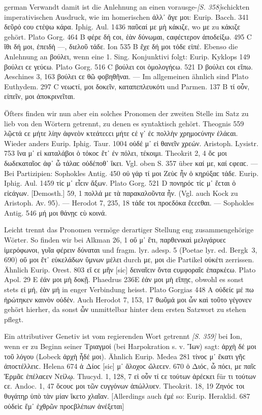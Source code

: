 \begin{otherlanguage*}{german}
Verwandt damit ist die Anlehnung an einen vorausge-\hypertarget{p358}{\emph{[S. 358]}}\label{p358}schickten imperativischen Ausdruck, wie im homerischen ἀλλ᾽ ἄγε μοι: Eurip. Bacch. 341 δεῦρό ϲου ϲτέψω κάρα. Iphig. Aul. 1436 παῦϲαί με μὴ κάκιζε, wo με zu κάκιζε gehört. Plato Gorg. 464 Β φέρε δή ϲοι, ἐὰν δύνωμαι, ϲαφέϲτερον ἀποδείξω. 495 C ἴθι δή μοι, ἐπειδὴ —, διελοῦ τάδε. Ion 535 Β ἔχε δή μοι τόδε εἰπέ. Ebenso die Anlehnung an βούλει, wenn eine 1. Sing. Konjunktivi folgt: Eurip. Kyklops 149 βούλει ϲε γεύϲω. Plato Gorg. 516 C βούλει ϲοι ὁμολογήϲω. 521 D βούλει ϲοι εἴπω. Aeschines 3, 163 βούλει ϲε θῶ φοβηθῆναι. — Im allgemeinen ähnlich sind Plato Euthydem. 297 C νεωϲτί, μοι δοκεῖν, καταπεπλευκότι und Parmen. 137 Β τί οὖν, εἰπεῖν, μοι ἀποκρινεῖται.

Öfters finden wir nun aber ein solches Pronomen der zweiten Stelle im Satz zu lieb von den Wörtern getrennt, zu denen es syntaktisch gehört. Theognis 559 λῷϲτά ϲε μήτε λίην ἀφνεὸν κτεάτεϲϲι μήτε ϲέ γ᾽ ἐϲ πολλὴν χρημοϲύνην ἐλάϲαι. Wieder anders Eurip. Iphig. Taur. 1004 οὐδέ μ᾽ εἰ θανεῖν χρεών. Aristoph. Lysistr. 753 ἵνα μ᾽ εἰ καταλάβοι ὁ τόκοϲ ἔτ᾽ ἐν πόλει, τέκοιμι. Theokrit 2, 4 ὅϲ μοι δωδεκαταῖοϲ ἀφ᾽ ὧ τάλαϲ οὐδέποθ᾽ ἵκει. Vgl. oben S. 357 über καί με, καί ϲφεαϲ. — Bei Partizipien: Sophokles Antig. 450 οὐ γάρ τί μοι Ζεὺϲ ἦν ὁ κηρύξαϲ τάδε. Eurip. Iphig. Aul. 1459 τίϲ μ᾽ εἶϲιν ἄξων. Plato Gorg. 521 D πονηρόϲ τίϲ μ᾽ ἔϲται ὁ εἰϲάγων. [Demosth.] 59, 1 πολλά με τὰ παρακαλοῦντα ἦν. (Vgl. auch Kock zu Aristoph. Av. 95). — Herodot 7, 235, 18 τάδε τοι προϲδόκα ἔϲεϲθαι. — Sophokles Antig. 546 μή μοι θάνῃϲ ϲὺ κοινά.

Leicht trennt das Pronomen vermöge derartiger Stellung eng zusammengehörige Wörter. So finden wir bei Alkman 26, 1 οὔ μ᾽ ἔτι, παρθενικαὶ μελιγάρυεϲ ἱμερόφωνοι, γυῖα φέρειν δύναται und fragm. lyr. adesp. 5 (Poetae lyr. ed. Bergk~3, 690) οὔ μοι ἔτ᾽ εὐκελάδων ὕμνων μέλει durch με, μοι die Partikel οὐκέτι zerrissen. Ähnlich Eurip. Orest. 803 εἴ ϲε μἢν [sic] δειναῖϲιν ὄντα ϲυμφοραῖϲ ἐπαρκέϲω. Plato Apol. 29 Ε ἐάν μοι μὴ δοκῇ. Phaedrus 236Ε ἐάν μοι μὴ εἴπῃϲ, obwohl es sonst stets εἰ μή, ἐὰν μή in enger Verbindung heisst. Plato Gorgias 448 A οὐδείϲ μέ πω ἠρώτηκεν καινὸν οὐδέν. Auch Herodot 7, 153, 17 θωῦμά μοι ὦν καὶ τοῦτο γέγονεν gehört hierher, da sonst ὦν unmittelbar hinter dem ersten Satzwort zu stehen pflegt.

Ein attributiver Genetiv ist vom regierenden Wort getrennt \hypertarget{p359}{\emph{[S. 359]}}\label{p359} bei Ion, wenn er zu Beginn seiner Τριαγμοί (bei Harpokration s. v. Ἴων) sagt: ἀρχὴ δέ μοι τοῦ λόγου (Lobeck ἀρχὴ ἧδέ μοι). Ähnlich Eurip. Medea 281 τίνοϲ μ᾽ ἕκατι γῆϲ ἀποϲτέλλειϲ. Helena 674 ἁ Δίοϲ [sic] μ᾽ ἄλοχοϲ ὤλεϲεν. 670 ὁ Διόϲ, ὦ πόϲι, με παῖϲ Ἑρμᾶϲ ἐπέλαϲεν Νείλῳ. Thucyd. 1, 128, 7 εἰ οὖν τί ϲε τούτων ἀρέϲκει für τι τούτων ϲε. Andoc. 1, 47 ὅϲουϲ μοι τῶν ϲυγγόνων ἀπώλλυεν. Theokrit. 18, 19 Ζηνόϲ τοι θυγάτηρ ὑπὸ τὰν μίαν ἵκετο χλαῖαν. [Allerdings auch ἐμέ so: Eurip. Heraklid. 687 οὐδεὶϲ ἔμ᾽ ἐχθρῶν προϲβλέπων ἀνέξεται]


\end{otherlanguage*}
